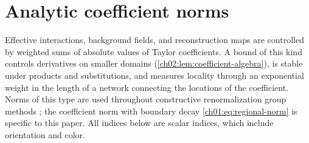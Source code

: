 \section{Analytic coefficient norms}\label{ch01:sec:norms}

Effective interactions, background fields, and reconstruction maps are controlled by weighted sums of absolute values of Taylor coefficients. A bound of this kind controls derivatives on smaller domains (\cref{ch02:lem:coefficient-algebra}), is stable under products and substitutions, and measures locality through an exponential weight in the length of a network connecting the locations of the coefficient. Norms of this type are used throughout constructive renormalization group methods \cite{Brydges1986,GawedzkiKupiainen1983b,Balaban1987RGI}; the coefficient norm with boundary decay \eqref{ch01:eq:regional-norm} is specific to this paper. All indices below are scalar indices, which include orientation and color.

